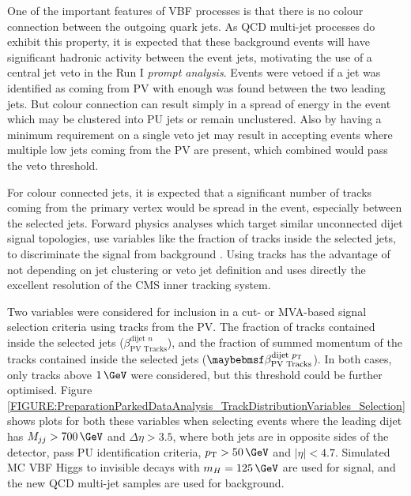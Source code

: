 %
%


One of the important features of \gls{VBF} processes is that there is no colour connection between the outgoing quark jets. As \gls{QCD} multi-jet processes do exhibit this property, it is expected that these background events will have significant hadronic activity between the event jets, motivating the use of a central jet veto in the Run I \textit{prompt analysis}. Events were vetoed if a jet was identified as coming from \gls{PV} with enough \pt was found between the two leading jets. But colour connection can result simply in a spread of energy in the event which may be clustered into \gls{PU} jets or remain unclustered. Also by having a minimum \pt requirement on a single veto jet may result in accepting events where multiple low \pt jets coming from the \gls{PV} are present, which combined would pass the veto threshold.

For colour connected jets, it is expected that a significant number of tracks coming from the primary vertex would be spread in the event, especially between the selected jets. Forward physics analyses which target similar unconnected dijet signal topologies, use variables like the fraction of tracks inside the selected jets, to discriminate the signal from background \cite{ARTICLE:AnalysisDiffractiveJets}. Using tracks has the advantage of not depending on jet clustering or veto jet definition and uses directly the excellent resolution of the \gls{CMS} inner tracking system. 

Two variables were considered for inclusion in a cut- or \gls{MVA}-based signal selection criteria using tracks from the \gls{PV}. The fraction of tracks contained inside the selected jets ($\beta_{\text{PV Tracks}}^{\text{dijet }n}$), and the fraction of summed momentum of the tracks contained inside the selected jets ($\beta_{\text{PV Tracks}}^{\text{dijet }\pt}$). In both cases, only tracks above $1\,\GeV$ were considered, but this threshold could be further optimised. Figure \ref{FIGURE:PreparationParkedDataAnalysis_TrackDistributionVariables_Selection} shows plots for both these variables when selecting events where the leading dijet has $M_{jj}>700\,\GeV$ and $\Delta\eta>3.5$, where both jets are in opposite sides of the detector, pass \gls{PU} identification criteria, $\pt>50\,\GeV$ and $|\eta|<4.7$. Simulated \gls{MC} \gls{VBF} Higgs to invisible decays with $m_H=125\,\GeV$ are used for signal, and the new \gls{QCD} multi-jet samples are used for background.


